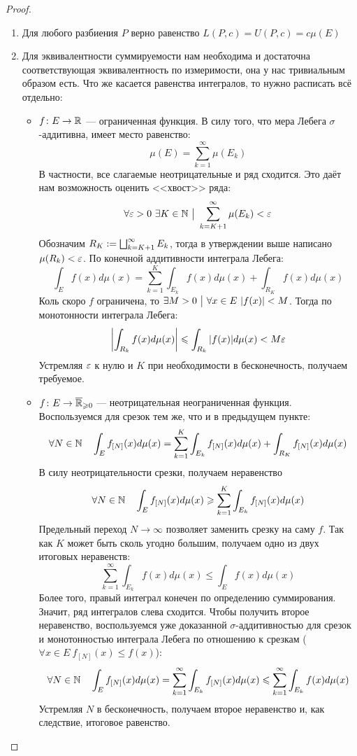 \begin{proof}~
	\begin{enumerate}
		\item Для любого разбиения $P$ верно равенство $L(P, c) = U(P, c) = c\mu(E)$
		
		\item Для эквивалентности суммируемости нам необходима и достаточна соответствующая эквивалентность по измеримости, она у нас тривиальным образом есть. Что же касается равенства интегралов, то нужно расписать всё отдельно:
		\begin{itemize}
			\item $f \colon E \to \mathbb{R}$ --- ограниченная функция. В силу того, что мера Лебега $\sigma$-аддитивна, имеет место равенство:
			\[
				\mu(E) = \sum_{k = 1}^\infty \mu(E_k)
			\]
			В частности, все слагаемые неотрицательные и ряд сходится. Это даёт нам возможность оценить <<хвост>> ряда:
			\[
				\forall \varepsilon > 0\ \exists K \in \mathbb{N} \ \big|\  \sum_{k = K + 1}^\infty \mu(E_k) < \varepsilon
			\]
			Обозначим $R_K := \bigsqcup_{k = K + 1}^\infty E_k$, тогда в утверждении выше написано $\mu(R_k) < \varepsilon$. По конечной аддитивности интеграла Лебега:
			\[
				\int_E f(x)d\mu(x) = \sum_{k = 1}^K \int_{E_k} f(x)d\mu(x) + \int_{R_K} f(x)d\mu(x)
			\]
			Коль скоро $f$ ограничена, то $\exists M > 0 \ \big|\   \forall x \in E\ |f(x)| < M$. Тогда по монотонности интеграла Лебега:
			\[
				\left|\int_{R_k} f(x)d\mu(x)\right| \leqslant \int_{R_k} |f(x)|d\mu(x) < M\varepsilon
			\]
			Устремляя $\varepsilon$ к нулю и $K$ при необходимости в бесконечность, получаем требуемое. 
			
			\item $f \colon E \to \overline{\mathbb{R}}_{\geqslant 0}$ --- неотрицательная неограниченная функция. Воспользуемся для срезок тем же, что и в предыдущем пункте:
			\[
				\forall N \in \mathbb{N} \quad \int_E f_{[N]}(x)d\mu(x) = \sum_{k = 1}^K \int_{E_k} f_{[N]}(x)d\mu(x) + \int_{R_K} f_{[N]}(x)d\mu(x)
			\]
			В силу неотрицательности срезки, получаем неравенство
			\[
				\forall N \in \mathbb{N} \quad \int_E f_{[N]}(x)d\mu(x) \geqslant \sum_{k = 1}^K \int_{E_k} f_{[N]}(x)d\mu(x)
			\]
			Предельный переход $N \to \infty$ позволяет заменить срезку на саму $f$. Так как $K$ может быть сколь угодно большим, получаем одно из двух итоговых неравенств:
			\[
				\sum_{k = 1}^\infty \int_{E_k} f(x)d\mu(x) \le \int_E f(x)d\mu(x)
			\]
			Более того, правый интеграл конечен по определению суммирования. Значит, ряд интегралов слева сходится. Чтобы получить второе неравенство, воспользуемся уже доказанной $\sigma$-аддитивностью для срезок и монотонностью интеграла Лебега по отношению к срезкам ($\forall x \in E\ f_{[N]}(x) \le f(x)$):
			\[
				\forall N \in \mathbb{N} \quad \int_E f_{[N]}(x)d\mu(x) = \sum_{k = 1}^\infty \int_{E_k} f_{[N]}(x)d\mu(x) \leqslant \sum_{k = 1}^\infty \int_{E_k} f(x)d\mu(x)
			\]
			Устремляя $N$ в бесконечность, получаем второе неравенство и, как следствие, итоговое равенство.
			

\end{itemize}
\end{enumerate}
\end{proof}
